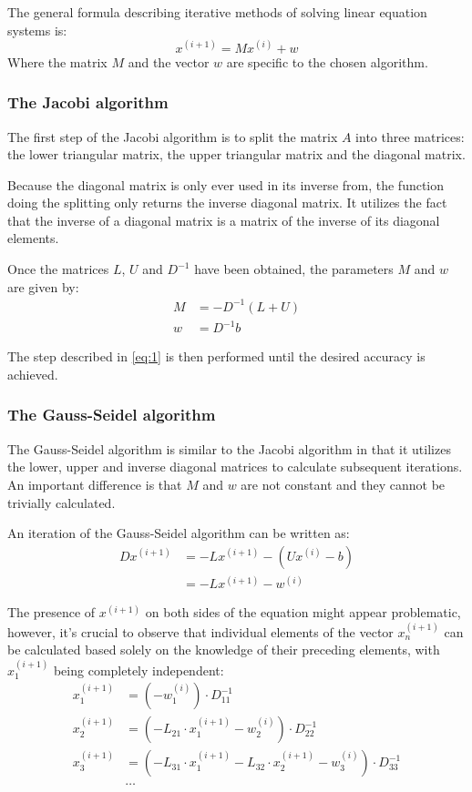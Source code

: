 \documentclass{article}
\begin{document}
	The general formula describing iterative methods of solving linear equation
	systems is:
	\begin{equation}\label{eq:1}
		x^{(i + 1)} = Mx^{(i)} + w
	\end{equation}
	Where the matrix $M$ and the vector $w$ are specific to the chosen
	algorithm.
	
	\subsubsection{The Jacobi algorithm}
	
	The first step of the Jacobi algorithm is to split the matrix $A$ into three
	matrices: the lower triangular matrix, the upper triangular matrix and the
	diagonal matrix.
	
	Because the diagonal matrix is only ever used in its inverse from, the
	function doing the splitting only returns the inverse diagonal matrix. It
	utilizes the fact that the inverse of a diagonal matrix is a matrix of the
	inverse of its diagonal elements.
	
	Once the matrices $L$, $U$ and $D^{-1}$ have been obtained, the parameters
	$M$ and $w$ are given by:
	\begin{align*}
		M &= -D^{-1}(L + U)\\
		w &= D^{-1}b
	\end{align*}
	
	The step described in \eqref{eq:1} is then performed until the desired
	accuracy is achieved.
	
	\subsubsection{The Gauss-Seidel algorithm}
	
	The Gauss-Seidel algorithm is similar to the Jacobi algorithm in that it
	utilizes the lower, upper and inverse diagonal matrices to calculate
	subsequent iterations. An important difference is that $M$ and $w$ are not
	constant and they cannot be trivially calculated.
	
	An iteration of the Gauss-Seidel algorithm can be written as:
	\begin{align*}
		Dx^{(i + 1)} &= -Lx^{(i + 1)} - (Ux^{(i)} - b)\\
		&= -Lx^{(i + 1)} - w^{(i)}
	\end{align*}
	
	The presence of $x^{(i + 1)}$ on both sides of the equation might appear
	problematic, however, it's crucial to observe that individual elements of
	the vector $x_n^{(i + 1)}$ can be calculated based solely on the knowledge
	of their preceding elements, with $x_1^{(i + 1)}$ being completely
	independent:
	\begin{align*}
		x_1^{(i + 1)} &= (-w_1^{(i)}) \cdot D^{-1}_{11}\\
		x_2^{(i + 1)} &= (-L_{21} \cdot x_1^{(i + 1)} - w_2^{(i)})
		\cdot D^{-1}_{22}\\
		x_3^{(i + 1)} &= (-L_{31} \cdot x_1^{(i + 1)}
		- L_{32} \cdot x_2^{(i + 1)}
		- w_3^{(i)}) \cdot D^{-1}_{33}\\
		&\ldots
	\end{align*}
	
\end{document}
